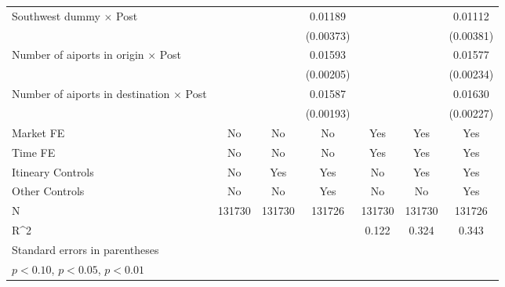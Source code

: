 \begin{table}[htbp]
\begin{tabular}{l*{6}{c}}
\addlinespace
Southwest dummy $\times$ Post&                     &                     &     0.01189\sym{***}&                     &                     &     0.01112\sym{***}\\
                    &                     &                     &   (0.00373)         &                     &                     &   (0.00381)         \\
\addlinespace
Number of aiports in origin $\times$ Post&                     &                     &     0.01593\sym{***}&                     &                     &     0.01577\sym{***}\\
                    &                     &                     &   (0.00205)         &                     &                     &   (0.00234)         \\
\addlinespace
Number of aiports in destination $\times$ Post&                     &                     &     0.01587\sym{***}&                     &                     &     0.01630\sym{***}\\
                    &                     &                     &   (0.00193)         &                     &                     &   (0.00227)         \\
\midrule
Market FE           &          No         &          No         &          No         &         Yes         &         Yes         &         Yes         \\
Time FE             &          No         &          No         &          No         &         Yes         &         Yes         &         Yes         \\
Itineary Controls   &          No         &         Yes         &         Yes         &          No         &         Yes         &         Yes         \\
Other Controls      &          No         &          No         &         Yes         &          No         &          No         &         Yes         \\
N                   &      131730         &      131730         &      131726         &      131730         &      131730         &      131726         \\
R^2                 &                     &                     &                     &       0.122         &       0.324         &       0.343         \\
\bottomrule
\multicolumn{7}{l}{\footnotesize Standard errors in parentheses}\\
\multicolumn{7}{l}{\footnotesize \sym{*} \(p<0.10\), \sym{**} \(p<0.05\), \sym{***} \(p<0.01\)}\\
\end{tabular}
\end{table}
